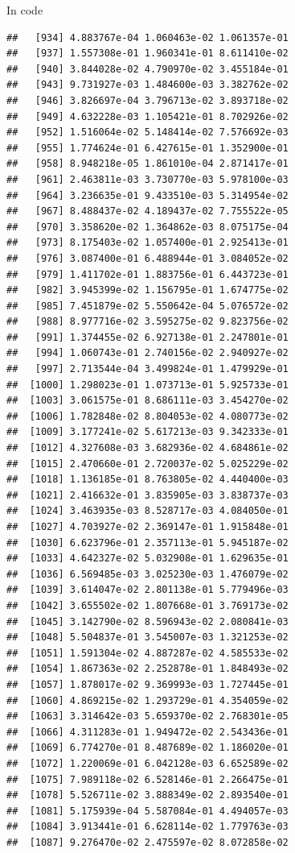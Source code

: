 \documentclass[ignorenonframetext,]{beamer}
\begin{document}
\begin{frame}[fragile]{In code}
\begin{verbatim}
##   [934] 4.883767e-04 1.060463e-02 1.061357e-01
##   [937] 1.557308e-01 1.960341e-01 8.611410e-02
##   [940] 3.844028e-02 4.790970e-02 3.455184e-01
##   [943] 9.731927e-03 1.484600e-03 3.382762e-02
##   [946] 3.826697e-04 3.796713e-02 3.893718e-02
##   [949] 4.632228e-03 1.105421e-01 8.702926e-02
##   [952] 1.516064e-02 5.148414e-02 7.576692e-03
##   [955] 1.774624e-01 6.427615e-01 1.352900e-01
##   [958] 8.948218e-05 1.861010e-04 2.871417e-01
##   [961] 2.463811e-03 3.730770e-03 5.978100e-03
##   [964] 3.236635e-01 9.433510e-03 5.314954e-02
##   [967] 8.488437e-02 4.189437e-02 7.755522e-05
##   [970] 3.358620e-02 1.364862e-03 8.075175e-04
##   [973] 8.175403e-02 1.057400e-01 2.925413e-01
##   [976] 3.087400e-01 6.488944e-01 3.084052e-02
##   [979] 1.411702e-01 1.883756e-01 6.443723e-01
##   [982] 3.945399e-02 1.156795e-01 1.674775e-02
##   [985] 7.451879e-02 5.550642e-04 5.076572e-02
##   [988] 8.977716e-02 3.595275e-02 9.823756e-02
##   [991] 1.374455e-02 6.927138e-01 2.247801e-01
##   [994] 1.060743e-01 2.740156e-02 2.940927e-02
##   [997] 2.713544e-04 3.499824e-01 1.479929e-01
##  [1000] 1.298023e-01 1.073713e-01 5.925733e-01
##  [1003] 3.061575e-01 8.686111e-03 3.454270e-02
##  [1006] 1.782848e-02 8.804053e-02 4.080773e-02
##  [1009] 3.177241e-02 5.617213e-03 9.342333e-01
##  [1012] 4.327608e-03 3.682936e-02 4.684861e-02
##  [1015] 2.470660e-01 2.720037e-02 5.025229e-02
##  [1018] 1.136185e-01 8.763805e-02 4.440400e-03
##  [1021] 2.416632e-01 3.835905e-03 3.838737e-03
##  [1024] 3.463935e-03 8.528717e-03 4.084050e-01
##  [1027] 4.703927e-02 2.369147e-01 1.915848e-01
##  [1030] 6.623796e-01 2.357113e-01 5.945187e-02
##  [1033] 4.642327e-02 5.032908e-01 1.629635e-01
##  [1036] 6.569485e-03 3.025230e-03 1.476079e-02
##  [1039] 3.614047e-02 2.801138e-01 5.779496e-03
##  [1042] 3.655502e-02 1.807668e-01 3.769173e-02
##  [1045] 3.142790e-02 8.596943e-02 2.080841e-03
##  [1048] 5.504837e-01 3.545007e-03 1.321253e-02
##  [1051] 1.591304e-02 4.887287e-02 4.585533e-02
##  [1054] 1.867363e-02 2.252878e-01 1.848493e-02
##  [1057] 1.878017e-02 9.369993e-03 1.727445e-01
##  [1060] 4.869215e-02 1.293729e-01 4.354059e-02
##  [1063] 3.314642e-03 5.659370e-02 2.768301e-05
##  [1066] 4.311283e-01 1.949472e-02 2.543436e-01
##  [1069] 6.774270e-01 8.487689e-02 1.186020e-01
##  [1072] 1.220069e-01 6.042128e-03 6.652589e-02
##  [1075] 7.989118e-02 6.528146e-01 2.266475e-01
##  [1078] 5.526711e-02 3.888349e-02 2.893540e-01
##  [1081] 5.175939e-04 5.587084e-01 4.494057e-03
##  [1084] 3.913441e-01 6.628114e-02 1.779763e-03
##  [1087] 9.276470e-02 2.475597e-02 8.072858e-02

\end{verbatim}
\end{frame}
\end{document}
